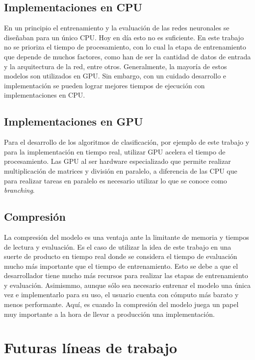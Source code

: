 \subsection*{Implementaciones en CPU}

\indent En un principio el entrenamiento y la evaluación de las redes neuronales se diseñaban para un único CPU. Hoy en día esto no es suficiente. En este trabajo no se prioriza el tiempo de procesamiento, con lo cual la etapa de entrenamiento que depende de muchos factores, como han de ser la cantidad de datos de entrada y la arquitectura de la red, entre otros. Generalmente, la mayoría de estos modelos son utilizados en GPU. Sin embargo, con un cuidado desarrollo e implementación se pueden lograr mejores tiempos de ejecución con implementaciones en CPU. 

\subsection*{Implementaciones en GPU}

\indent Para el desarrollo de los algoritmos de clasificación, por ejemplo de este trabajo y para la implementación en tiempo real, utilizar GPU acelera el tiempo de procesamiento. Las GPU al ser hardware especializado que permite realizar multiplicación de matrices y división en paralelo, a diferencia de las CPU que para realizar tareas en paralelo es necesario utilizar lo que se conoce como \textit{branching}. 

\subsection*{Compresión}

\indent La compresión del modelo es una ventaja ante la limitante de memoria y tiempos de lectura y evaluación. Es el caso de utilizar la idea de este trabajo en una suerte de producto en tiempo real donde se considera el tiempo de evaluación mucho más importante que el tiempo de entrenamiento. Esto se debe a que el desarrollador tiene mucho más recursos para realizar las etapas de entrenamiento y evaluación. Asimismmo, aunque sólo sea necesario entrenar el modelo una única vez e implementarlo para su uso, el usuario cuenta con cómputo más barato y menos performante. Aquí, es cuando la compresión del modelo juega un papel muy importante a la hora de llevar a producción una implementación.

\section{Futuras líneas de trabajo}

